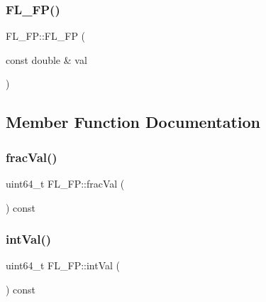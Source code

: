 \mbox{\label{class_f_l___f_p_a552b545bb667d5a6436e89f33586e9fa}} 
\subsubsection{\texorpdfstring{F\+L\+\_\+\+F\+P()}{FL\_FP()}\hspace{0.1cm}{\footnotesize\ttfamily [4/4]}}
{\footnotesize\ttfamily F\+L\+\_\+\+F\+P\+::\+F\+L\+\_\+\+FP (\begin{DoxyParamCaption}\item[{const double \&}]{val }\end{DoxyParamCaption})}



\subsection{Member Function Documentation}
\mbox{\label{class_f_l___f_p_adeac9cc0d327d4759ac35890c13978c0}} 
\subsubsection{\texorpdfstring{frac\+Val()}{fracVal()}}
{\footnotesize\ttfamily uint64\+\_\+t F\+L\+\_\+\+F\+P\+::frac\+Val (\begin{DoxyParamCaption}{ }\end{DoxyParamCaption}) const\hspace{0.3cm}{\ttfamily [inline]}}

\mbox{\label{class_f_l___f_p_acffd4f751e5042dbed4a28bfe3f90ea5}} 
\subsubsection{\texorpdfstring{int\+Val()}{intVal()}}
{\footnotesize\ttfamily uint64\+\_\+t F\+L\+\_\+\+F\+P\+::int\+Val (\begin{DoxyParamCaption}{ }\end{DoxyParamCaption}) const\hspace{0.3cm}{\ttfamily [inline]}}

